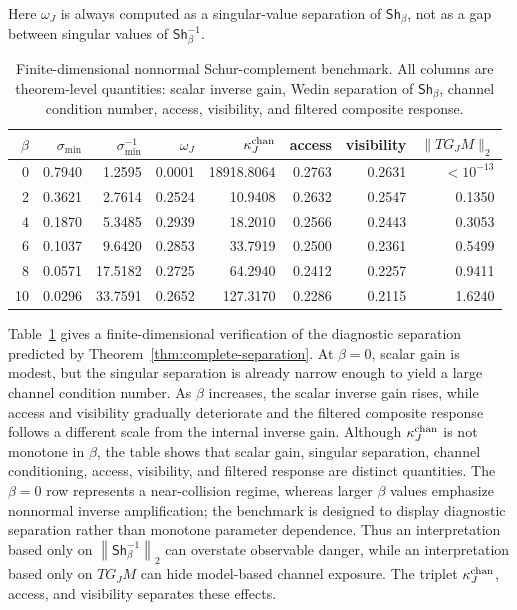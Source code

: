 \documentclass[review]{siamart220329}
\theoremstyle{definition}
\theoremstyle{remark}
\newcommand{\Sh}{\mathsf{Sh}}
\newcommand{\norm}[1]{\left\lVert #1\right\rVert}
\begin{document}
Here $\omega_J$ is always computed as a singular-value separation of $\Sh_\beta$, not as a gap between singular values of $\Sh_\beta^{-1}$.

\begin{table}[h]
\centering
\caption{Finite-dimensional nonnormal Schur-complement benchmark. All columns are theorem-level quantities: scalar inverse gain, Wedin separation of $\Sh_\beta$, channel condition number, access, visibility, and filtered composite response.}
\label{tab:application-beta}
\begin{tabular}{@{}rrrrrrrr@{}}
\toprule
$\beta$ & $\sigma_{\min}$ & $\sigma_{\min}^{-1}$ & $\omega_J$ & $\kappa_J^{\rm chan}$ & access & visibility & $\|TG_JM\|_2$ \\
\midrule
0  & 0.7940 & 1.2595 & 0.0001 & 18918.8064 & 0.2763 & 0.2631 & $<10^{-13}$ \\
2  & 0.3621 & 2.7614 & 0.2524 & 10.9408 & 0.2632 & 0.2547 & 0.1350 \\
4  & 0.1870 & 5.3485 & 0.2939 & 18.2010 & 0.2566 & 0.2443 & 0.3053 \\
6  & 0.1037 & 9.6420 & 0.2853 & 33.7919 & 0.2500 & 0.2361 & 0.5499 \\
8  & 0.0571 & 17.5182 & 0.2725 & 64.2940 & 0.2412 & 0.2257 & 0.9411 \\
10  & 0.0296 & 33.7591 & 0.2652 & 127.3170 & 0.2286 & 0.2115 & 1.6240 \\
\bottomrule
\end{tabular}
\end{table}

Table~\ref{tab:application-beta} gives a finite-dimensional verification of the
diagnostic separation predicted by Theorem~\ref{thm:complete-separation}. At $\beta=0$,
scalar gain is modest, but the singular separation is already narrow enough to
yield a large channel condition number. As $\beta$ increases, the scalar inverse
gain rises, while access and visibility gradually deteriorate and the filtered
composite response follows a different scale from the internal inverse gain.
Although $\kappa_J^{\rm chan}$ is not monotone in $\beta$, the table shows that
scalar gain, singular separation, channel conditioning, access, visibility, and
filtered response are distinct quantities. The $\beta=0$ row represents a near-collision regime, whereas larger $\beta$ values emphasize nonnormal inverse amplification; the benchmark is designed to display diagnostic separation rather than monotone parameter dependence. Thus an interpretation based only on
$\norm{\Sh_\beta^{-1}}_2$ can overstate observable danger, while an
interpretation based only on $TG_JM$ can hide model-based channel exposure. The
triplet $\kappa_J^{\rm chan}$, access, and visibility separates these effects.
\end{document}
